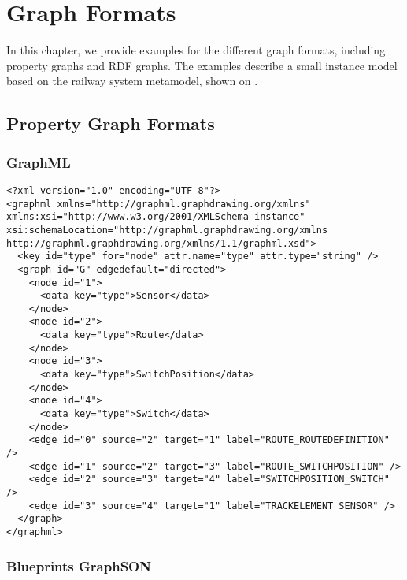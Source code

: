 \appendix
 
\chapter{Graph Formats}

In this chapter, we provide examples for the different graph formats, including property graphs and RDF graphs. The examples describe a small instance model based on the railway system metamodel, shown on .

 
\section{Property Graph Formats}
\label{sec:property-graph-formats}

\subsection{GraphML}
\label{subsec:graphml}

\lstset{language=XML,breaklines=true}
\begin{lstlisting}[caption=A graph based on the railway system metamodel stored in \graphml{} format]
<?xml version="1.0" encoding="UTF-8"?>
<graphml xmlns="http://graphml.graphdrawing.org/xmlns" xmlns:xsi="http://www.w3.org/2001/XMLSchema-instance" xsi:schemaLocation="http://graphml.graphdrawing.org/xmlns http://graphml.graphdrawing.org/xmlns/1.1/graphml.xsd">
  <key id="type" for="node" attr.name="type" attr.type="string" />
  <graph id="G" edgedefault="directed">
    <node id="1">
      <data key="type">Sensor</data>
    </node>
    <node id="2">
      <data key="type">Route</data>
    </node>
    <node id="3">
      <data key="type">SwitchPosition</data>
    </node>
    <node id="4">
      <data key="type">Switch</data>
    </node>
    <edge id="0" source="2" target="1" label="ROUTE_ROUTEDEFINITION" />
    <edge id="1" source="2" target="3" label="ROUTE_SWITCHPOSITION" />
    <edge id="2" source="3" target="4" label="SWITCHPOSITION_SWITCH" />
    <edge id="3" source="4" target="1" label="TRACKELEMENT_SENSOR" />
  </graph>
</graphml>
\end{lstlisting}

\subsection{Blueprints GraphSON}
\label{subsec:blueprints-graphson}

